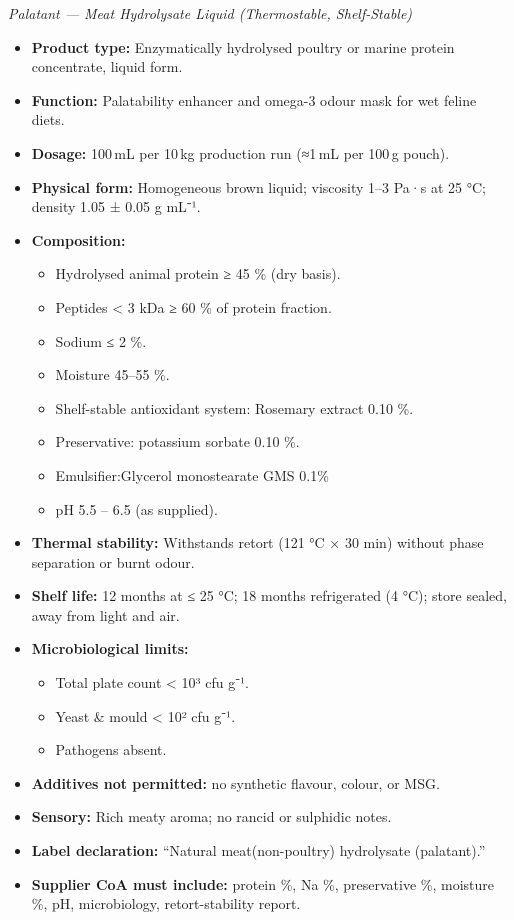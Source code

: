\textit{Palatant — Meat Hydrolysate Liquid (Thermostable, Shelf-Stable)}

\begin{itemize}
  \item \textbf{Product type:} Enzymatically hydrolysed poultry or marine protein concentrate, liquid form.
  \item \textbf{Function:} Palatability enhancer and omega-3 odour mask for wet feline diets.
  \item \textbf{Dosage:} 100\,mL per 10\,kg production run (≈1\,mL per 100\,g pouch).
  \item \textbf{Physical form:} Homogeneous brown liquid; viscosity 1–3 Pa·s at 25 °C; density 1.05 ± 0.05 g mL⁻¹.
  \item \textbf{Composition:}
    \begin{itemize}
      \item Hydrolysed animal protein ≥ 45 \% (dry basis).
      \item Peptides < 3 kDa ≥ 60 \% of protein fraction.
      \item Sodium ≤ 2 \%.
      \item Moisture 45–55 \%.
      \item Shelf-stable antioxidant system: Rosemary extract 0.10 \%.
      \item Preservative: potassium sorbate 0.10 \%.
      \item Emulsifier:Glycerol monostearate GMS 0.1\%
      \item pH 5.5 – 6.5 (as supplied).
    \end{itemize}
  \item \textbf{Thermal stability:} Withstands retort (121 °C × 30 min) without phase separation or burnt odour.
  \item \textbf{Shelf life:} 12 months at ≤ 25 °C; 18 months refrigerated (4 °C); store sealed, away from light and air.
  \item \textbf{Microbiological limits:}
    \begin{itemize}
      \item Total plate count < 10³ cfu g⁻¹.
      \item Yeast \& mould < 10² cfu g⁻¹.
      \item Pathogens absent.
    \end{itemize}
  \item \textbf{Additives not permitted:} no synthetic flavour, colour, or MSG.
  \item \textbf{Sensory:} Rich meaty aroma; no rancid or sulphidic notes.
  \item \textbf{Label declaration:} “Natural meat(non-poultry) hydrolysate (palatant).”
  \item \textbf{Supplier CoA must include:} protein \%, Na \%, preservative \%, moisture \%, pH, microbiology, retort-stability report.
\end{itemize}
